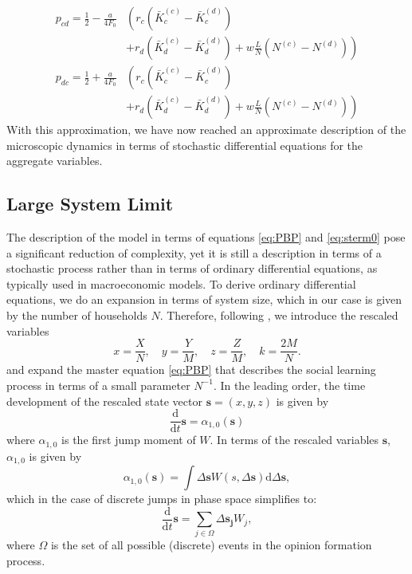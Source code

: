 \begin{align}
	p_{cd} = \frac{1}{2} - \frac{a}{4 F_0} &\left(r_c\left( \bar{K}_c^{(c)} - \bar{K}_c^{(d)} \right) \right. \nonumber \\ 
	& \left. + r_d\left( \bar{K}_d^{(c)} - \bar{K}_d^{(d)} \right) + w\frac{L}{N}\left( N^{(c)} - N^{(d)} \right) \right) \label{eq:approx_p_cd_final}\\
	p_{dc} = \frac{1}{2} + \frac{a}{4 F_0} &\left(r_c\left( \bar{K}_c^{(c)} - \bar{K}_c^{(d)} \right) \right. \nonumber \\ 
	& \left. + r_d\left( \bar{K}_d^{(c)} - \bar{K}_d^{(d)} \right) + w\frac{L}{N}\left( N^{(c)} - N^{(d)} \right) \right)  \label{eq:approx_p_dc_final}
\end{align}
With this approximation, we have now reached an approximate description of the microscopic dynamics in terms of stochastic differential equations for the aggregate variables.
\subsection{Large System Limit}
\label{sec:large_system_limit}
The description of the model in terms of equations \eqref{eq:PBP} and \eqref{eq:sterm0} pose a significant reduction of complexity, yet it is still a description in terms of a stochastic process rather than in terms of ordinary differential equations, as typically used in macroeconomic models. To derive ordinary differential equations, we do an expansion in terms of system size, which in our case is given by the number of households $N$.
Therefore, following \citet[p. 244]{VanKampen1992}, we introduce the rescaled variables
\begin{equation}
	x = \frac{X}{N}, \quad y = \frac{Y}{M}, \quad z = \frac{Z}{M}, \quad k = \frac{2M}{N}.
	\label{eq:rescalled_pbp_variables}
\end{equation}
and expand the master equation \eqref{eq:PBP} that describes the social learning process in terms of a small parameter $N^{-1}$. In the leading order, the time development of the rescaled state vector $\mathbf{s} = (x, y, z)$ is given by 
\begin{equation}
	\frac{\mathrm{d}}{\mathrm{d}t}\mathbf{s} = \alpha_{1,0}(\mathbf{s})
	\label{macroscopic_equation}
\end{equation}
where $\alpha_{1,0}$ is the first jump moment of $W$. In terms of the rescaled variables $\mathbf{s}$, $\alpha_{1,0}$ is given by
\begin{equation}
	\alpha_{1,0}(\mathbf{s}) = \int \Delta \mathbf{s} W(s, \Delta \mathbf{s}) {\mathrm d} \Delta \mathbf{s},
	\label{eq:jump_moment}
\end{equation}
which in the case of discrete jumps in phase space simplifies to:
\begin{equation}
	\frac{\mathrm{d}}{\mathrm{d}t}\mathbf{s} = \sum_{j \in \Omega}  \Delta \mathbf{s_j} W_j,
	\label{eq:transitions}
\end{equation}
where $\Omega$ is the set of all possible (discrete) events in the opinion formation process.

